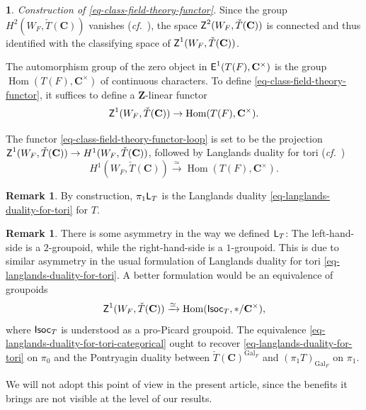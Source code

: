 \documentclass[10pt,english,reqno]{amsart}
\newcommand{\integers}{\mathbf Z}
\newcommand{\complexes}{\mathbf C}
\newcommand{\Isoc}{\textnormal{\textsf{Isoc}}}
\newcommand{\Gal}{\operatorname{Gal}}
\newcommand{\cycle}{\textnormal{\textsf{Z}}}
\newcommand{\extension}{\textnormal{\textsf{E}}}
\newcommand{\Hom}{\operatorname{Hom}}
\newcommand{\Langlands}{\textnormal{\textsf{L}}}
\theoremstyle{definition}
\newtheorem{rem}[subsubsection]{Remark}
\numberwithin{equation}{section}
\newtheorem{untitledsubsubsection}[subsubsection]{}
\newenvironment{void}
{\begin{untitledsubsubsection}}
{\end{untitledsubsubsection}}
\begin{document}

\begin{void}\emph{Construction of \eqref{eq-class-field-theory-functor}.}
Since the group $H^2(W_F, \check T(\complexes))$ vanishes (\emph{cf.}~\cite[Theorem 3.2.2]{MR3003999}), the space $\cycle^2(W_F, \check T(\complexes))$ is connected and thus identified with the classifying space of $\cycle^1(W_F, \check T(\complexes))$.

The automorphism group of the zero object in $\extension^1(T(F), \complexes^{\times})$ is the group $\Hom(T(F), \complexes^{\times})$ of continuous characters. To define \eqref{eq-class-field-theory-functor}, it suffices to define a $\integers$-linear functor
\begin{equation}
\label{eq-class-field-theory-functor-loop}
\cycle^1(W_F, \check T(\complexes)) \rightarrow \Hom(T(F), \complexes^{\times}).
\end{equation}

The functor \eqref{eq-class-field-theory-functor-loop} is set to be the projection $\cycle^1(W_F, \check T(\complexes)) \rightarrow H^1(W_F, \check T(\complexes))$, followed by Langlands duality for tori (\emph{cf.}~\cite[\S7.5]{MR2508725})
\begin{equation}
\label{eq-langlands-duality-for-tori}
H^1(W_F, \check T(\complexes)) \xrightarrow{\simeq} \Hom(T(F), \complexes^{\times}).
\end{equation}
\end{void}


\begin{rem}
\label{rem-class-field-theory-functor-loop}
By construction, $\pi_1\Langlands_T$ is the Langlands duality \eqref{eq-langlands-duality-for-tori} for $T$.
\end{rem}


\begin{rem}
There is some asymmetry in the way we defined $\Langlands_T$: The left-hand-side is a $2$-groupoid, while the right-hand-side is a $1$-groupoid. This is due to similar asymmetry in the usual formulation of Langlands duality for tori \eqref{eq-langlands-duality-for-tori}. A better formulation would be an equivalence of groupoids
\begin{equation}
\label{eq-langlands-duality-for-tori-categorical}
\cycle^1(W_F, \check T(\complexes)) \xrightarrow{\simeq} \Hom(\Isoc_T, */\complexes^{\times}),
\end{equation}
where $\Isoc_T$ is understood as a pro-Picard groupoid. The equivalence \eqref{eq-langlands-duality-for-tori-categorical} ought to recover \eqref{eq-langlands-duality-for-tori} on $\pi_0$ and the Pontryagin duality between $\check T(\complexes)^{\Gal_F}$ and $(\pi_1T)_{\Gal_F}$ on $\pi_1$.

We will not adopt this point of view in the present article, since the benefits it brings are not visible at the level of our results.
\end{rem}
\end{document}
